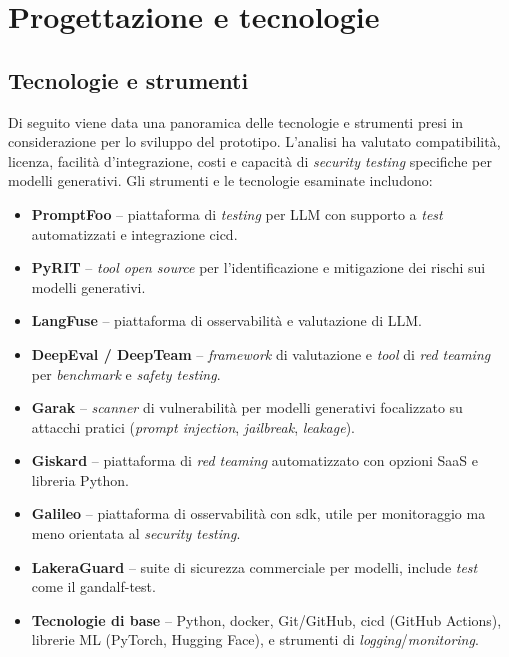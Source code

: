 \chapter{Progettazione e tecnologie}
\label{cap:progettazione-codifica}


\section{Tecnologie e strumenti}
\label{sec:tecnologie-strumenti}

Di seguito viene data una panoramica delle tecnologie e strumenti presi in considerazione per lo sviluppo del prototipo. L'analisi ha valutato compatibilità, licenza, facilità d'integrazione, costi e capacità di \emph{security testing} specifiche per modelli generativi. Gli strumenti e le tecnologie esaminate includono:

\begin{itemize}
    \item \textbf{PromptFoo} -- piattaforma di \emph{testing} per LLM con supporto a \emph{test} automatizzati e integrazione \gls{cicd}.
    \item \textbf{PyRIT} -- \emph{tool open source} per l'identificazione e mitigazione dei rischi sui modelli generativi.
    \item \textbf{LangFuse} -- piattaforma di osservabilità e valutazione di LLM.
    \item \textbf{DeepEval / DeepTeam} -- \emph{framework} di valutazione e \emph{tool} di \emph{red teaming} per \emph{benchmark} e \emph{safety testing}.
    \item \textbf{Garak} -- \emph{scanner} di vulnerabilità per modelli generativi focalizzato su attacchi pratici (\emph{prompt injection}, \emph{jailbreak}, \emph{leakage}).
    \item \textbf{Giskard} -- piattaforma di \emph{red teaming} automatizzato con opzioni SaaS e libreria Python.
    \item \textbf{Galileo} -- piattaforma di osservabilità con \gls{sdk}\glsfirstoccur, utile per monitoraggio ma meno orientata al \emph{security testing}.
    \item \textbf{LakeraGuard} -- suite di sicurezza commerciale per modelli, include \emph{test} come il \gls{gandalf-test}.
    \item \textbf{Tecnologie di base} -- Python, \gls{docker}\glsfirstoccur, Git/GitHub, \gls{cicd} (GitHub Actions), librerie ML (PyTorch, Hugging Face), e strumenti di \emph{logging}/\emph{monitoring}.
\end{itemize}

